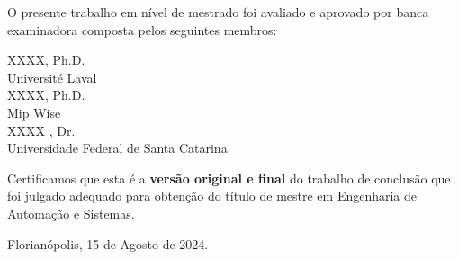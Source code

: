 
\begin{folhadeaprovacao}
	
	\begin{center}
		{\ABNTEXchapterfont\large\imprimirautor}
		
		\begin{center}
			\ABNTEXchapterfont\bfseries\large\imprimirtitulo
		\end{center}
		
		O presente trabalho em nível de mestrado foi avaliado e aprovado por banca examinadora composta pelos seguintes membros: 
		
		\vspace*{0.5cm}
		XXXX, Ph.D. \\
		Université Laval  \\
		\vspace*{0.5cm}
		XXXX, Ph.D. \\
		Mip Wise \\
		\vspace*{0.5cm}
		XXXX , Dr. \\
		Universidade Federal de Santa Catarina \\
		\vspace*{1cm}
		
		Certificamos que esta é a \textbf{versão original e final} do trabalho de conclusão que foi julgado adequado para obtenção do título de mestre em Engenharia de Automação e Sistemas.
		
		\vspace*{0.5cm}
		\vspace*{0.5cm}
	\end{center}
	
	\begin{center}
		\vspace*{\fill}
		Florianópolis, 15 de Agosto de 2024.
		\vspace*{1cm}
	\end{center}
	
\end{folhadeaprovacao}

